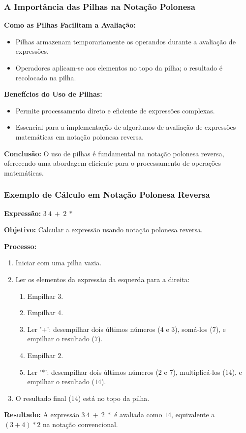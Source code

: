 \begin{frame}[fragile]
  \frametitle{A Importância das Pilhas na Notação Polonesa}
  
  \textbf{Como as Pilhas Facilitam a Avaliação:}
  \begin{itemize}
    \item Pilhas armazenam temporariamente os operandos durante a avaliação de expressões.
    \item Operadores aplicam-se aos elementos no topo da pilha; o resultado é recolocado na pilha.
  \end{itemize}
  
  \textbf{Benefícios do Uso de Pilhas:}
  \begin{itemize}
    \item Permite processamento direto e eficiente de expressões complexas.
    \item Essencial para a implementação de algoritmos de avaliação de expressões matemáticas em notação polonesa reversa.
  \end{itemize}
  
  \textbf{Conclusão:}
  O uso de pilhas é fundamental na notação polonesa reversa, oferecendo uma abordagem eficiente para o processamento de operações matemáticas.
\end{frame}
\begin{frame}[fragile]
  \frametitle{Exemplo de Cálculo em Notação Polonesa Reversa}

  \textbf{Expressão:} \(3\ 4\ +\ 2\ \ast\)

  \textbf{Objetivo:} Calcular a expressão usando notação polonesa reversa.
  
  \textbf{Processo:}

  \begin{enumerate}
    \item Iniciar com uma pilha vazia.
    \item Ler os elementos da expressão da esquerda para a direita:
      \begin{enumerate}
        \item Empilhar \(3\).
        \item Empilhar \(4\).
        \item Ler '+': desempilhar dois últimos números (\(4\) e \(3\)), somá-los (\(7\)), e empilhar o resultado (\(7\)).
        \item Empilhar \(2\).
        \item Ler '\(\ast\)': desempilhar dois últimos números (\(2\) e \(7\)), multiplicá-los (\(14\)), e empilhar o resultado (\(14\)).
      \end{enumerate}
    \item O resultado final (\(14\)) está no topo da pilha.
  \end{enumerate}

  \textbf{Resultado:} A expressão \(3\ 4\ +\ 2\ \ast\) é avaliada como \(14\), equivalente a \((3 + 4) \ast 2\) na notação convencional.
\end{frame}
